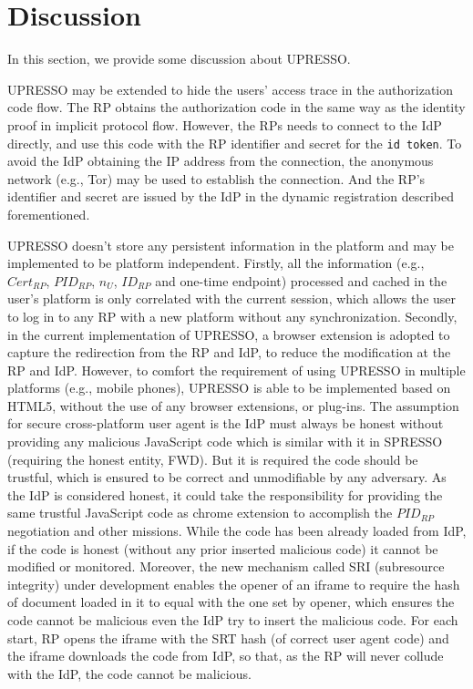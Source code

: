\section{Discussion}
\label{sec:discussion}
In this section, we provide some discussion about UPRESSO.

 UPRESSO may be extended to hide the users' access trace in  the authorization code flow. The RP obtains the authorization code in the same way as the  identity proof in implicit protocol flow. However, the RPs needs to connect to the IdP directly, and  use this code with  the RP identifier and secret for the \verb+id token+. To avoid the IdP obtaining the IP address from the connection, the anonymous network (e.g., Tor) may be used to establish the connection. And the RP's identifier and secret are issued by the IdP in the dynamic registration described forementioned.


 UPRESSO doesn't store any persistent information in the platform and may be implemented to be platform independent. Firstly, all the information (e.g., $Cert_{RP}$, $PID_{RP}$, $n_U$, $ID_{RP}$ and one-time endpoint) processed and cached in the user's platform is only correlated with the current session, which allows the user to log in to any RP with a new platform without any synchronization. Secondly, in the current implementation of UPRESSO, a browser extension is adopted to capture the redirection from the RP and IdP, to reduce the modification at the RP and IdP.
However, to comfort the requirement of using UPRESSO in multiple platforms (e.g., mobile phones), UPRESSO is able to be implemented based on HTML5, without the use of any browser extensions, or plug-ins. The assumption for secure cross-platform user agent is the IdP must always be honest without providing any malicious JavaScript code which is similar with it in SPRESSO (requiring the honest entity, FWD). But it is required the code should be trustful, which is ensured to be correct and unmodifiable by any adversary. As the IdP is considered honest, it could take the responsibility for providing the same trustful JavaScript code as chrome extension to accomplish the $PID_{RP}$ negotiation and other missions. While the code has been already loaded from IdP, if the code is honest (without any prior inserted malicious code) it cannot be modified or monitored. Moreover, the new mechanism called SRI (subresource integrity) under development enables the opener of an iframe to require the hash of document loaded in it to equal with the one set by opener, which ensures the code cannot be malicious even the IdP try to insert the malicious code. For each start, RP opens the iframe with the SRT hash (of correct user agent code) and the iframe downloads the code from IdP, so that, as the RP will never collude with the IdP, the code cannot be malicious.

